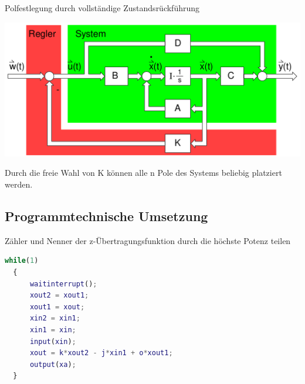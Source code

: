 \documentclass[10pt,a4paper]{article}
\begin{document}
Polfestlegung durch vollständige Zustandsrückführung

\includegraphics[width=0.9\columnwidth]{Figures/Polfestlegung.png}

Durch die freie Wahl von K können alle n Pole des Systems beliebig platziert werden.

\subsection{Programmtechnische Umsetzung}
Zähler und Nenner der z-Übertragungsfunktion durch die höchste Potenz teilen

\begin{lstlisting}[language=Matlab]
  while(1)
  {
      waitinterrupt();
      xout2 = xout1;
      xout1 = xout;
      xin2 = xin1;
      xin1 = xin;
      input(xin);
      xout = k*xout2 - j*xin1 + o*xout1;
      output(xa);
  }
\end{lstlisting}
\end{document}
